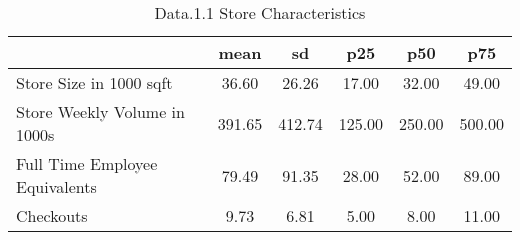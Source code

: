 \begin{table}[htbp]
\caption{\label{clabel} Data.1.1 Store Characteristics}\centering\medskip
\begin{tabular}{lccccc} \hline \hline
 & mean  & sd  & p25  & p50  & p75  \\  \hline 
Store Size in 1000 sqft &        36.60 &        26.26 &        17.00 &        32.00 &        49.00 \\  
Store Weekly Volume in 1000s &       391.65 &       412.74 &       125.00 &       250.00 &       500.00 \\  
Full Time Employee Equivalents &        79.49 &        91.35 &        28.00 &        52.00 &        89.00 \\  
Checkouts &         9.73 &         6.81 &         5.00 &         8.00 &        11.00 \\  
\hline \hline \end{tabular}
\end{table}
